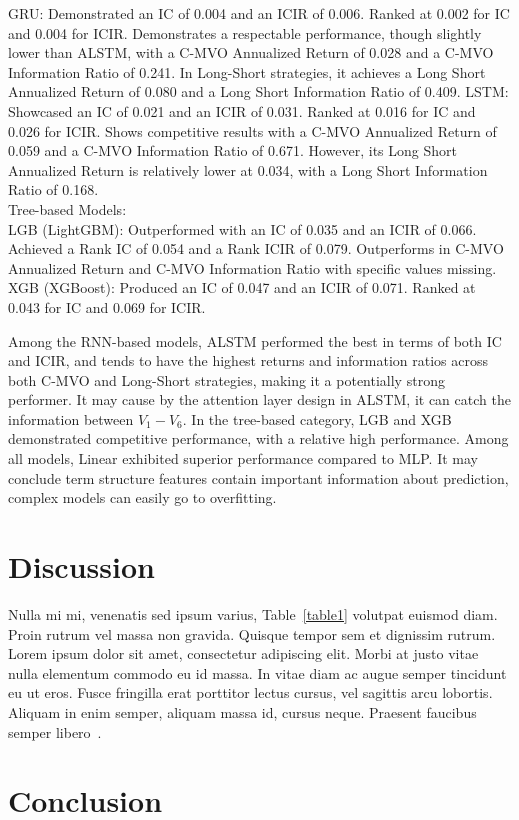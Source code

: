 \documentclass[10pt,letterpaper]{article}
\begin{document}
GRU: Demonstrated an IC of 0.004 and an ICIR of 0.006. Ranked at 0.002 for IC and 0.004 for ICIR. Demonstrates a respectable performance, though slightly lower than ALSTM, with a C-MVO Annualized Return of 0.028 and a C-MVO Information Ratio of 0.241. In Long-Short strategies, it achieves a Long Short Annualized Return of 0.080 and a Long Short Information Ratio of 0.409.
LSTM: Showcased an IC of 0.021 and an ICIR of 0.031. Ranked at 0.016 for IC and 0.026 for ICIR. Shows competitive results with a C-MVO Annualized Return of 0.059 and a C-MVO Information Ratio of 0.671. However, its Long Short Annualized Return is relatively lower at 0.034, with a Long Short Information Ratio of 0.168.
\\Tree-based Models:
\\LGB (LightGBM): Outperformed with an IC of 0.035 and an ICIR of 0.066. Achieved a Rank IC of 0.054 and a Rank ICIR of 0.079. Outperforms in C-MVO Annualized Return and C-MVO Information Ratio with specific values missing. 
XGB (XGBoost): Produced an IC of 0.047 and an ICIR of 0.071. Ranked at 0.043 for IC and 0.069 for ICIR.

Among the RNN-based models, ALSTM performed the best in terms of both IC and ICIR, and tends to have the highest returns and information ratios across both C-MVO and Long-Short strategies, making it a potentially strong performer. It may cause by the attention layer design in ALSTM, it can catch the information between $V_1-V_6$.
In the tree-based category, LGB and XGB demonstrated competitive performance, with a relative high performance. 
Among all models, Linear exhibited superior performance compared to MLP. It may conclude term structure features contain important information about prediction, complex models can easily go to overfitting.


\section*{Discussion}
Nulla mi mi, venenatis sed ipsum varius, Table~\ref{table1} volutpat euismod diam. Proin rutrum vel massa non gravida. Quisque tempor sem et dignissim rutrum. Lorem ipsum dolor sit amet, consectetur adipiscing elit. Morbi at justo vitae nulla elementum commodo eu id massa. In vitae diam ac augue semper tincidunt eu ut eros. Fusce fringilla erat porttitor lectus cursus, vel sagittis arcu lobortis. Aliquam in enim semper, aliquam massa id, cursus neque. Praesent faucibus semper libero~\cite{bib3}.

\section*{Conclusion}
\end{document}
